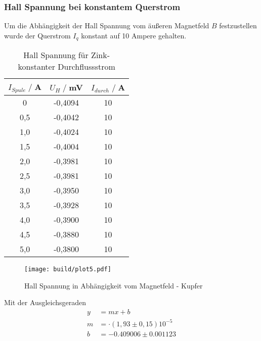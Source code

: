 \subsubsection{Hall Spannung bei konstantem Querstrom}
Um die Abhängigkeit der Hall Spannung vom äußeren Magnetfeld $B$ festzustellen wurde der Querstrom $I_q$ konstant auf 10 Ampere gehalten.
\begin{table}
    \centering
    \begin{tabular}{c c c}
        \toprule
        $I_{Spule} \;/\;$A & $U_H\;/\;$mV & $I_{durch} \;/\;$A\\
        \midrule
            0                   &-0,4094&             10\\
            0,5                 &-0,4042&             10\\
            1,0                 &-0,4024&             10\\
            1,5                 &-0,4004&             10\\
            2,0                 &-0,3981&             10\\
            2,5                 &-0,3981&             10\\
            3,0                 &-0,3950&             10\\
            3,5                 &-0,3928&             10\\
            4,0                 &-0,3900&             10\\
            4,5                 &-0,3880&             10\\
            5,0                 &-0,3800&             10\\
        \bottomrule
    \end{tabular}
    \caption{Hall Spannung für Zink- konstanter Durchflussstrom}
    \label{tab:Zn_I}
\end{table}
\begin{figure}[H]
    \centering
    \texttt{[image: build/plot5.pdf]}
    \caption{Hall Spannung in Abhängigkeit vom Magnetfeld - Kupfer}
    \label{fig:Cu_I}
\end{figure}
Mit der Ausgleichsgeraden
\begin{align*}
    y &= mx + b\\
    m &= \cdot (1,93\pm0,15)10^{-5}\\
    b &=  -0.409006\pm 0.001123\\ %
\end{align*}


